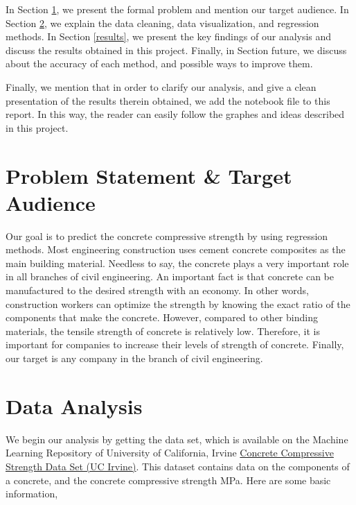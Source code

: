 \documentclass[a4paper,11pt]{amsart}
\begin{document}
\medbreak

In Section \ref{problem}, we present the formal problem and mention our target audience. In Section \ref{dataanalysis}, we explain the data cleaning, data visualization, and regression methods. In Section \ref{results}, we present the key findings of our analysis and discuss the results obtained in this project. Finally, in Section {future}, we discuss about the accuracy of each method, and possible ways to improve them.

\medbreak

Finally, we mention that in order to clarify our analysis, and give a clean presentation of the results therein obtained, we add the notebook file to this report. In this way, the reader can easily follow the graphes and ideas described in this project.

\section{Problem Statement \& Target Audience}\label{problem} 

Our goal is to predict the concrete compressive strength by using regression methods. Most engineering construction uses cement concrete composites as the main building material. Needless to say, the concrete plays a very important role in all branches of civil engineering. An important fact is that concrete can be manufactured to the desired strength with an economy. In other words, construction workers can optimize the strength by knowing the exact ratio of the components that make the concrete. However, compared to other binding materials, the tensile strength of concrete is relatively low. Therefore, it is important for companies to increase their levels of strength of concrete.
Finally, our target is any company in the branch of civil engineering.

\section{Data Analysis}\label{dataanalysis}

We begin our analysis by getting the data set, which is available on the Machine Learning Repository of University of California, Irvine \href{https://archive.ics.uci.edu/ml/datasets/Concrete+Compressive+Strength}{Concrete Compressive Strength Data Set (UC Irvine)}. This dataset contains data on the components of a concrete, and the concrete compressive strength MPa. Here are some basic information,
\end{document}
